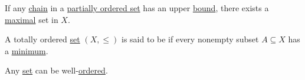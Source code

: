 \begin{lemma}\label{thm:zorns_lemma}\cite{nLab:zorns_lemma}
  If any \hyperref[def:poset_chain]{chain} in a \hyperref[def:poset]{partially ordered set} has an upper \hyperref[def:preordered_set/upper_lower_bound]{bound}, there exists a \hyperref[def:preordered_set/maximal_minimal_element]{maximal} set in \( X \).
\end{lemma}

\begin{definition}\label{def:well_ordered_set}
  A totally ordered \hyperref[def:totally_ordered_set]{set} \( (X, \leq) \) is said to be  if every nonempty subset \( A \subseteq X \) has a \hyperref[def:preordered_set/largest_smallest_element]{minimum}.
\end{definition}

\begin{theorem}\label{thm:well_ordering_principle}\cite[196]{Enderton1977}
  Any \hyperref[def:set_zfc]{set} can be well-\hyperref[def:well_ordered_set]{ordered}.
\end{theorem}
